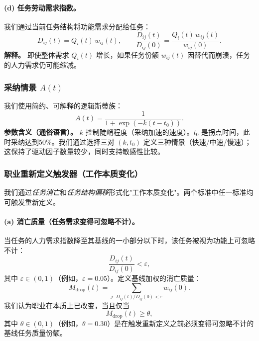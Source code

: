 \paragraph{(d) 任务劳动需求指数。}
我们通过当前任务结构将功能需求分配给任务：
\begin{equation}
\label{eq:D_def}
D_{ij}(t) = Q_i(t)\,w_{ij}(t),
\qquad
\frac{D_{ij}(t)}{D_{ij}(0)}=\frac{Q_i(t)\,w_{ij}(t)}{w_{ij}(0)}.
\end{equation}
\indent\textbf{解释。} 即使整体需求 $Q_i(t)$ 增长，如果任务份额 $w_{ij}(t)$ 因替代而崩溃，任务的人力需求仍可能缩减。

\subsubsection{\texorpdfstring{采纳情景 $A(t)$}{采纳情景 A(t)}}
\label{sec:adoption}
我们使用简约、可解释的逻辑斯蒂族：
\begin{equation}
\label{eq:adoption_logistic}
A(t) = \frac{1}{1+\exp\!\left(-k(t-t_0)\right)}.
\end{equation}
\indent\textbf{参数含义（通俗语言）。} $k$ 控制陡峭程度（采纳加速的速度）。$t_0$ 是拐点时间，此时采纳达到50\%。我们通过选择三对 $(k,t_0)$ 定义三种情景（快速/中速/慢速）；这保持了驱动因子数量较少，同时支持敏感性比较。

\subsubsection{职业重新定义触发器（工作本质变化）}
\label{sec:redefinition}
我们通过\emph{任务消亡}和\emph{任务结构偏移}形式化"工作本质变化"。两个标准中任一标准均可触发重新定义。

\paragraph{(a) 消亡质量（任务需求变得可忽略不计）。}
当任务的人力需求指数降至其基线的一小部分以下时，该任务被视为功能上可忽略不计：
\begin{equation}
\label{eq:extinction_rule}
\frac{D_{ij}(t)}{D_{ij}(0)}<\varepsilon,
\end{equation}
其中 $\varepsilon\in(0,1)$（例如，$\varepsilon=0.05$）。定义基线加权的消亡质量：
\begin{equation}
\label{eq:Mdrop}
M_{\text{drop}}(t)=\sum_{j:\,D_{ij}(t)/D_{ij}(0)<\varepsilon} w_{ij}(0).
\end{equation}
我们认为职业在本质上已改变，当且仅当
\begin{equation}
\label{eq:Mdrop_trigger}
M_{\text{drop}}(t)\ge \theta,
\end{equation}
其中 $\theta\in(0,1)$（例如，$\theta=0.30$）是在触发重新定义之前必须变得可忽略不计的基线任务质量份额。

